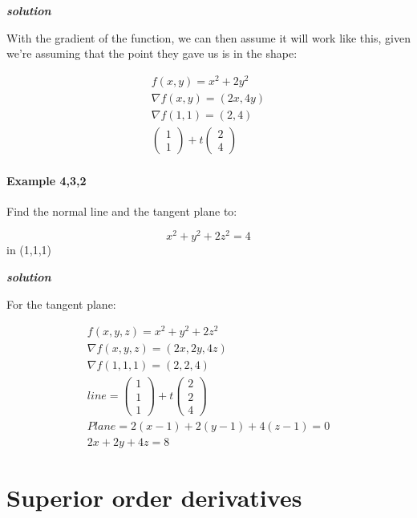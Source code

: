 \documentclass[11pt,fleqn]{book} %
\begin{document}
\textit{\textbf{solution}}

With the gradient of the function, we can then assume it will work like this, given we're assuming that the point they gave us is in the shape:

\begin{gather}
    f(x,y) = x^2 + 2y^2\\
    \nabla f(x,y) = (2x, 4y)\\
    \nabla f(1,1) = (2,4)\\
    \begin{pmatrix}
        1\\1
    \end{pmatrix} + t \begin{pmatrix}
        2\\4
    \end{pmatrix}
\end{gather}


\paragraph{Example 4,3,2}

Find the normal line and the tangent plane to:

$$x^2+y^2+2z^2=4$$ in (1,1,1)

\textit{\textbf{solution}}

For the tangent plane:

\begin{gather}
    f(x,y,z) = x^2 +y^2 +2z^2\\
    \nabla f(x,y,z) = (2x,2y,4z)\\
    \nabla f(1,1,1) = (2,2,4)\\
    line = \begin{pmatrix}
        1\\1\\1
    \end{pmatrix} + t \begin{pmatrix}
        2\\2\\4
    \end{pmatrix}\\
    Plane = 2(x-1) + 2(y-1) + 4(z-1) = 0 \\
    2x+2y+4z = 8
\end{gather}

\section{Superior order derivatives}
\end{document}
